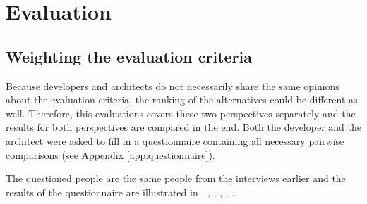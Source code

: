 \chapter{Evaluation}
\label{chap:evaluation}

\section{Weighting the evaluation criteria}

Because developers and architects do not necessarily share the same opinions about the evaluation criteria, the ranking of the alternatives could be different as well. Therefore, this evaluations covers these two perspectives separately and the results for both perspectives are compared in the end. Both the developer and the architect were asked to fill in a questionnaire containing all necessary pairwise comparisons (see Appendix \ref{app:questionnaire}). 

The questioned people are the same people from the interviews earlier and the results of the questionnaire are illustrated in , , , , , .

